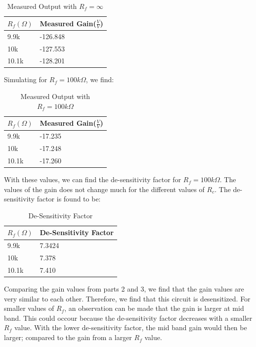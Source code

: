 \documentclass[12pt]{article}
\begin{document}
\begin{table}[h!]
    \centering
    \begin{tabular}{ll}
    $R_f(\Omega)$ & Measured Gain($\frac{V}{V}$) \\ \hline
    9.9k & -126.848 \\ 
    10k & -127.553 \\
    10.1k & -128.201
    \end{tabular}
    \caption{Measured Output with $R_f=\infty$}
    \label{measuredoutinf}
\end{table}
\FloatBarrier

Simulating for $R_f=100k\Omega$, we find:

\begin{table}[h!]
    \centering
    \begin{tabular}{ll}
    $R_f(\Omega)$ & Measured Gain($\frac{V}{V}$) \\ \hline
    9.9k & -17.235 \\ 
    10k & -17.248 \\
    10.1k & -17.260
    \end{tabular}
    \caption{Measured Output with $R_f=100k\Omega$}
    \label{measuredout}
\end{table}
\FloatBarrier 

With these values, we can find the de-sensitivity factor for $R_f=100k\Omega$. The values of the 
gain does not change much for the different values of $R_c$. The de-sensitivity factor is found to be:

\begin{table}[h!]
    \centering
    \begin{tabular}{ll}
    $R_f(\Omega)$ & De-Sensitivity Factor \\ \hline
    9.9k & 7.3424 \\ 
    10k & 7.378 \\
    10.1k & 7.410
    \end{tabular}
    \caption{De-Sensitivity Factor}
    \label{desens}
\end{table}
\FloatBarrier

Comparing the gain values from parts 2 and 3, we 
find that the gain values are very similar to each other. Therefore, we find that this 
circuit is desensitized. For smaller values of $R_f$, an observation can be made that the gain is larger at mid band.
This could occour because the de-sensitivity factor decreases with a smaller $R_f$ value. With the lower de-sensitivity 
factor, the mid band gain would then be larger; compared to the gain from a larger $R_f$ value. 
\end{document}
